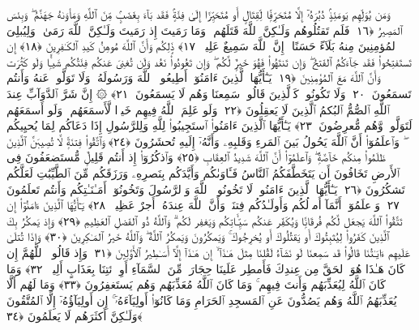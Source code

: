  وَمَن يُوَلِّهِم يَومَئِذٍۢ دُبُرَهُۥٓ إِلَّا مُتَحَرِّفًۭا لِّقِتَالٍ أَو مُتَحَيِّزًا إِلَىٰ فِئَةٍۢ فَقَد بَآءَ بِغَضَبٍۢ مِّنَ ٱللَّهِ وَمَأوَىٰهُ جَهَنَّمُ ۖ وَبِئسَ ٱلمَصِيرُ ﴿١٦﴾
 فَلَم تَقتُلُوهُم وَلَـٰكِنَّ ٱللَّهَ قَتَلَهُم ۚ وَمَا رَمَيتَ إِذ رَمَيتَ وَلَـٰكِنَّ ٱللَّهَ رَمَىٰ ۚ وَلِيُبلِىَ ٱلمُؤمِنِينَ مِنهُ بَلَآءً حَسَنًا ۚ إِنَّ ٱللَّهَ سَمِيعٌ عَلِيمٌۭ ﴿١٧﴾
 ذَٟلِكُم وَأَنَّ ٱللَّهَ مُوهِنُ كَيدِ ٱلكَـٰفِرِينَ ﴿١٨﴾
 إِن تَستَفتِحُوا۟ فَقَد جَآءَكُمُ ٱلفَتحُ ۖ وَإِن تَنتَهُوا۟ فَهُوَ خَيرٌۭ لَّكُم ۖ وَإِن تَعُودُوا۟ نَعُد وَلَن تُغنِىَ عَنكُم فِئَتُكُم شَيـًۭٔا وَلَو كَثُرَت وَأَنَّ ٱللَّهَ مَعَ ٱلمُؤمِنِينَ ﴿١٩﴾
 يَـٰٓأَيُّهَا ٱلَّذِينَ ءَامَنُوٓا۟ أَطِيعُوا۟ ٱللَّهَ وَرَسُولَهُۥ وَلَا تَوَلَّوا۟ عَنهُ وَأَنتُم تَسمَعُونَ ﴿٢٠﴾
 وَلَا تَكُونُوا۟ كَٱلَّذِينَ قَالُوا۟ سَمِعنَا وَهُم لَا يَسمَعُونَ ﴿٢١﴾
 ۞ إِنَّ شَرَّ ٱلدَّوَآبِّ عِندَ ٱللَّهِ ٱلصُّمُّ ٱلبُكمُ ٱلَّذِينَ لَا يَعقِلُونَ ﴿٢٢﴾
 وَلَو عَلِمَ ٱللَّهُ فِيهِم خَيرًۭا لَّأَسمَعَهُم ۖ وَلَو أَسمَعَهُم لَتَوَلَّوا۟ وَّهُم مُّعرِضُونَ ﴿٢٣﴾
 يَـٰٓأَيُّهَا ٱلَّذِينَ ءَامَنُوا۟ ٱستَجِيبُوا۟ لِلَّهِ وَلِلرَّسُولِ إِذَا دَعَاكُم لِمَا يُحيِيكُم ۖ وَٱعلَمُوٓا۟ أَنَّ ٱللَّهَ يَحُولُ بَينَ ٱلمَرءِ وَقَلبِهِۦ وَأَنَّهُۥٓ إِلَيهِ تُحشَرُونَ ﴿٢٤﴾
 وَٱتَّقُوا۟ فِتنَةًۭ لَّا تُصِيبَنَّ ٱلَّذِينَ ظَلَمُوا۟ مِنكُم خَآصَّةًۭ ۖ وَٱعلَمُوٓا۟ أَنَّ ٱللَّهَ شَدِيدُ ٱلعِقَابِ ﴿٢٥﴾
 وَٱذكُرُوٓا۟ إِذ أَنتُم قَلِيلٌۭ مُّستَضعَفُونَ فِى ٱلأَرضِ تَخَافُونَ أَن يَتَخَطَّفَكُمُ ٱلنَّاسُ فَـَٔاوَىٰكُم وَأَيَّدَكُم بِنَصرِهِۦ وَرَزَقَكُم مِّنَ ٱلطَّيِّبَٰتِ لَعَلَّكُم تَشكُرُونَ ﴿٢٦﴾
 يَـٰٓأَيُّهَا ٱلَّذِينَ ءَامَنُوا۟ لَا تَخُونُوا۟ ٱللَّهَ وَٱلرَّسُولَ وَتَخُونُوٓا۟ أَمَـٰنَـٰتِكُم وَأَنتُم تَعلَمُونَ ﴿٢٧﴾
 وَٱعلَمُوٓا۟ أَنَّمَآ أَموَٟلُكُم وَأَولَـٰدُكُم فِتنَةٌۭ وَأَنَّ ٱللَّهَ عِندَهُۥٓ أَجرٌ عَظِيمٌۭ ﴿٢٨﴾
 يَـٰٓأَيُّهَا ٱلَّذِينَ ءَامَنُوٓا۟ إِن تَتَّقُوا۟ ٱللَّهَ يَجعَل لَّكُم فُرقَانًۭا وَيُكَفِّر عَنكُم سَيِّـَٔاتِكُم وَيَغفِر لَكُم ۗ وَٱللَّهُ ذُو ٱلفَضلِ ٱلعَظِيمِ ﴿٢٩﴾
 وَإِذ يَمكُرُ بِكَ ٱلَّذِينَ كَفَرُوا۟ لِيُثبِتُوكَ أَو يَقتُلُوكَ أَو يُخرِجُوكَ ۚ وَيَمكُرُونَ وَيَمكُرُ ٱللَّهُ ۖ وَٱللَّهُ خَيرُ ٱلمَـٰكِرِينَ ﴿٣٠﴾
 وَإِذَا تُتلَىٰ عَلَيهِم ءَايَـٰتُنَا قَالُوا۟ قَد سَمِعنَا لَو نَشَآءُ لَقُلنَا مِثلَ هَـٰذَآ ۙ إِن هَـٰذَآ إِلَّآ أَسَـٰطِيرُ ٱلأَوَّلِينَ ﴿٣١﴾
 وَإِذ قَالُوا۟ ٱللَّهُمَّ إِن كَانَ هَـٰذَا هُوَ ٱلحَقَّ مِن عِندِكَ فَأَمطِر عَلَينَا حِجَارَةًۭ مِّنَ ٱلسَّمَآءِ أَوِ ٱئتِنَا بِعَذَابٍ أَلِيمٍۢ ﴿٣٢﴾
 وَمَا كَانَ ٱللَّهُ لِيُعَذِّبَهُم وَأَنتَ فِيهِم ۚ وَمَا كَانَ ٱللَّهُ مُعَذِّبَهُم وَهُم يَستَغفِرُونَ ﴿٣٣﴾
 وَمَا لَهُم أَلَّا يُعَذِّبَهُمُ ٱللَّهُ وَهُم يَصُدُّونَ عَنِ ٱلمَسجِدِ ٱلحَرَامِ وَمَا كَانُوٓا۟ أَولِيَآءَهُۥٓ ۚ إِن أَولِيَآؤُهُۥٓ إِلَّا ٱلمُتَّقُونَ وَلَـٰكِنَّ أَكثَرَهُم لَا يَعلَمُونَ ﴿٣٤﴾
